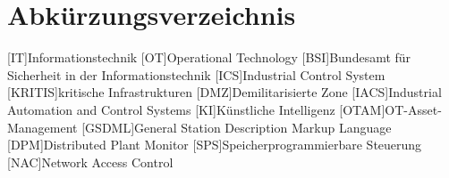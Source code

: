 \section*{Abkürzungsverzeichnis}
\begin{acronym}
  [IT]{Informationstechnik}
  [OT]{Operational Technology}
  [BSI]{Bundesamt für Sicherheit in der Informationstechnik}
  [ICS]{Industrial Control System}
  [KRITIS]{kritische Infrastrukturen}
  [DMZ]{Demilitarisierte Zone}
  [IACS]{Industrial Automation and Control Systems}
  [KI]{Künstliche Intelligenz}
  [OTAM]{OT-Asset-Management}
  [GSDML]{General Station Description Markup Language}
  [DPM]{Distributed Plant Monitor}
  [SPS]{Speicherprogrammierbare Steuerung}
    [NAC]{Network Access Control}
\end{acronym}
\newpage

